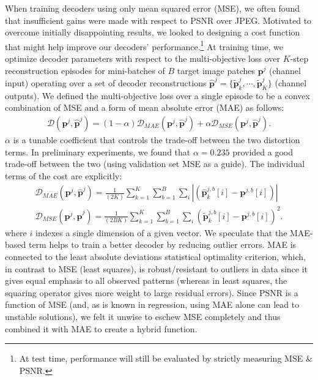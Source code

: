\documentclass[smallabstract,smallcaptions]{dccpaper}
\begin{document}
When training decoders using only mean squared error (MSE), we often found that insufficient gains were made with respect to PSNR over JPEG. Motivated to overcome initially disappointing results, we looked to designing a cost function that might help improve our decoders' performance.\footnote{At test time, performance will still be evaluated by strictly measuring MSE \& PSNR.} At training time, we optimize decoder parameters with respect to the multi-objective loss over $K$-step reconstruction episodes for mini-batches of $B$ target image patches $\mathbf{p}^j$ (channel input) operating over a set of decoder reconstructions $\widehat{\mathbf{p}}^j = \{ \widetilde{\mathbf{p}}^j_k, \cdots, \widetilde{\mathbf{p}}^j_K \}$ (channel outputs). We defined the multi-objective loss over a single episode to be a convex combination of MSE and a form of mean absolute error (MAE) as follows:
\begin{align}
\mathcal{D}(\mathbf{p}^j,\widehat{\mathbf{p}}^j) = (1 - \alpha) \mathcal{D}_{MAE}(\mathbf{p}^j,\widehat{\mathbf{p}}^j) + \alpha \mathcal{D}_{MSE}(\mathbf{p}^j,\widehat{\mathbf{p}}^j) \mbox{.} \label{cost_function}
\end{align}
$\alpha$ is a tunable coefficient that controls the trade-off between the two distortion terms. In preliminary experiments, we found that $\alpha = 0.235$ provided a good trade-off between the two (using validation set MSE as a guide).
The individual terms of the cost are explicitly:
\begin{align}
\mathcal{D}_{MAE}(\mathbf{p}^j,\widehat{\mathbf{p}}^j) = \frac{1}{(2 K)}  \sum^K_{k=1} \sum^B_{b=1} \sum_i | ( \widehat{\mathbf{p}}^{j,b}_k[i] - \mathbf{p}^{j,b}[i] ) | \label{eqn:mae} \\
\mathcal{D}_{MSE}(\mathbf{p}^j,\widehat{\mathbf{p}}^j) = \frac{1}{(2 B K)}  \sum^K_{k=1} \sum^B_{b=1} \sum_i ( \widetilde{\mathbf{p}}^{j,b}_k[i] - \mathbf{p}^{j,b}[i] )^2 \mbox{.} \label{eqn:mse}
\end{align}
where $i$ indexes a single dimension of a given vector.
We speculate that the MAE-based term helps to train a better decoder by reducing outlier errors. MAE is connected to the least absolute deviations statistical optimality criterion, which, in contrast to MSE (least squares), is robust/resistant to outliers in data since it gives equal emphasis to all observed patterns (whereas in least squares, the squaring operator gives more weight to large residual errors). Since PSNR is a function of MSE (and, as is known in regression, using MAE alone can lead to unstable solutions), we felt it unwise to eschew MSE completely and thus combined it with MAE to create a hybrid function.
\end{document}
